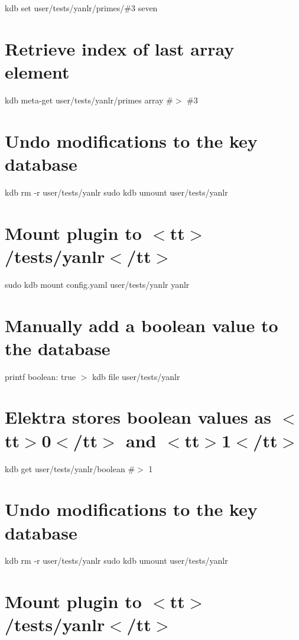 kdb set user/tests/yanlr/primes/\#3 seven\hypertarget{autotoc_md861_autotoc_md877}{}\section{Retrieve index of last array element}\label{autotoc_md861_autotoc_md877}
kdb meta-\/get user/tests/yanlr/primes array \#$>$ \#3\hypertarget{autotoc_md861_autotoc_md878}{}\section{Undo modifications to the key database}\label{autotoc_md861_autotoc_md878}
kdb rm -\/r user/tests/yanlr sudo kdb umount user/tests/yanlr 
\begin{DoxyCode}{0}
\end{DoxyCode}
 \hypertarget{autotoc_md861_autotoc_md879}{}\section{Mount plugin to $<$tt$>$/tests/yanlr$<$/tt$>$}\label{autotoc_md861_autotoc_md879}
sudo kdb mount config.\+yaml user/tests/yanlr yanlr\hypertarget{autotoc_md861_autotoc_md880}{}\section{Manually add a boolean value to the database}\label{autotoc_md861_autotoc_md880}
printf \textquotesingle{}boolean\+: true\textquotesingle{} $>$ {\ttfamily kdb file user/tests/yanlr}\hypertarget{autotoc_md861_autotoc_md881}{}\section{Elektra stores boolean values as $<$tt$>$0$<$/tt$>$ and $<$tt$>$1$<$/tt$>$}\label{autotoc_md861_autotoc_md881}
kdb get user/tests/yanlr/boolean \#$>$ 1\hypertarget{autotoc_md861_autotoc_md882}{}\section{Undo modifications to the key database}\label{autotoc_md861_autotoc_md882}
kdb rm -\/r user/tests/yanlr sudo kdb umount user/tests/yanlr 
\begin{DoxyCode}{0}
\end{DoxyCode}
 \hypertarget{autotoc_md861_autotoc_md883}{}\section{Mount plugin to $<$tt$>$/tests/yanlr$<$/tt$>$}\label{autotoc_md861_autotoc_md883}
